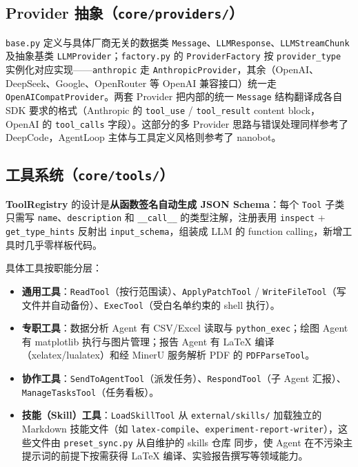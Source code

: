 \documentclass[a4paper,11pt]{article}
\begin{document}
\subsection{Provider 抽象（\texttt{core/providers/}）}

\texttt{base.py} 定义与具体厂商无关的数据类 \texttt{Message}、\texttt{LLMResponse}、\texttt{LLMStreamChunk} 及抽象基类 \texttt{LLMProvider}；\texttt{factory.py} 的 \texttt{ProviderFactory} 按 \texttt{provider\_type} 实例化对应实现——\texttt{anthropic} 走 \texttt{AnthropicProvider}，其余（OpenAI、DeepSeek、Google、OpenRouter 等 OpenAI 兼容接口）统一走 \texttt{OpenAICompatProvider}。两套 Provider 把内部的统一 \texttt{Message} 结构翻译成各自 SDK 要求的格式（Anthropic 的 \texttt{tool\_use} / \texttt{tool\_result} content block，OpenAI 的 \texttt{tool\_calls} 字段）。这部分的多 Provider 思路与错误处理同样参考了 DeepCode\cite{deepcode}，AgentLoop 主体与工具定义风格则参考了 nanobot\cite{nanobot}。

\subsection{工具系统（\texttt{core/tools/}）}

\textbf{ToolRegistry} 的设计是\textbf{从函数签名自动生成 JSON Schema}：每个 \texttt{Tool} 子类只需写 \texttt{name}、\texttt{description} 和 \texttt{\_\_call\_\_} 的类型注解，注册表用 \texttt{inspect} + \texttt{get\_type\_hints} 反射出 \texttt{input\_schema}，组装成 LLM 的 function calling，新增工具时几乎零样板代码。

具体工具按职能分层：

\begin{itemize}[leftmargin=1.4em,itemsep=2pt]
  \item \textbf{通用工具}：\texttt{ReadTool}（按行范围读）、\texttt{ApplyPatchTool} / \texttt{WriteFileTool}（写文件并自动备份）、\texttt{ExecTool}（受白名单约束的 shell 执行）。
  \item \textbf{专职工具}：数据分析 Agent 有 CSV/Excel 读取与 \texttt{python\_exec}；绘图 Agent 有 matplotlib 执行与图片管理；报告 Agent 有 LaTeX 编译（xelatex/lualatex）和经 MinerU\cite{mineru} 服务解析 PDF 的 \texttt{PDFParseTool}。
  \item \textbf{协作工具}：\texttt{SendToAgentTool}（派发任务）、\texttt{RespondTool}（子 Agent 汇报）、\texttt{ManageTasksTool}（任务看板）。
  \item \textbf{技能（Skill）工具}：\texttt{LoadSkillTool} 从 \texttt{external/skills/} 加载独立的 Markdown 技能文件（如 \texttt{latex-compile}、\texttt{experiment-report-writer}），这些文件由 \texttt{preset\_sync.py} 从自维护的 skills 仓库\cite{skills} 同步，使 Agent 在不污染主提示词的前提下按需获得 LaTeX 编译、实验报告撰写等领域能力。
\end{itemize}
\end{document}
